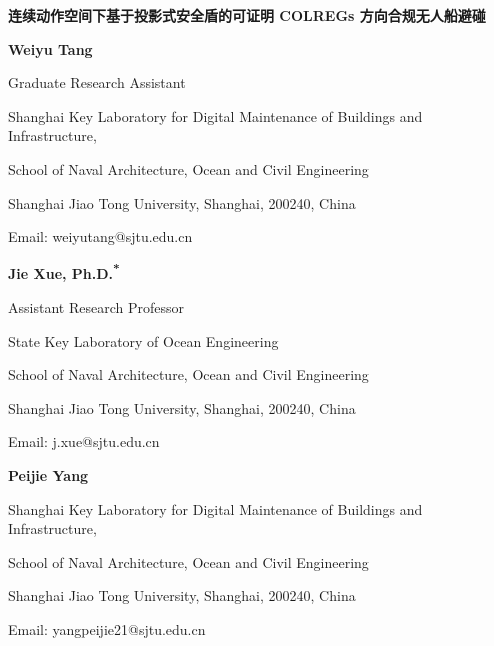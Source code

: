 \documentclass[12pt,letterpaper]{article}
\begin{document}
\linenumbers

\begin{flushleft}
{\bfseries 连续动作空间下基于投影式安全盾的可证明 COLREGs 方向合规无人船避碰}\par
\vspace{12pt}

{\bfseries Weiyu Tang}\par
Graduate Research Assistant\par
Shanghai Key Laboratory for Digital Maintenance of Buildings and Infrastructure,\par
School of Naval Architecture, Ocean and Civil Engineering\par
Shanghai Jiao Tong University, Shanghai, 200240, China\par
Email: weiyutang@sjtu.edu.cn\par
\vspace{12pt}

{\bfseries Jie Xue, Ph.D.\textsuperscript{*}}\par
Assistant Research Professor\par
State Key Laboratory of Ocean Engineering\par
School of Naval Architecture, Ocean and Civil Engineering\par
Shanghai Jiao Tong University, Shanghai, 200240, China\par
Email: j.xue@sjtu.edu.cn\par
\vspace{12pt}

{\bfseries Peijie Yang}\par
Shanghai Key Laboratory for Digital Maintenance of Buildings and Infrastructure,\par
School of Naval Architecture, Ocean and Civil Engineering\par
Shanghai Jiao Tong University, Shanghai, 200240, China\par
Email: yangpeijie21@sjtu.edu.cn\par
\vspace{12pt}


\end{flushleft}
\end{document}
